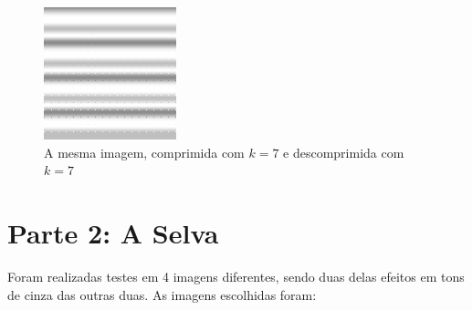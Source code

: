\documentclass{article}
\newcommand\tab[1][1cm]{\hspace*{#1}}
\begin{document}
\begin{figure}[!hbt]
	\centering
	\includegraphics[width=0.2\linewidth]{zoologico/pb2decompressed}
	\caption{A mesma imagem, comprimida com $k=7$ e descomprimida com $k=7$}
\end{figure}

\newpage
\section{\newpage Parte 2: A Selva}
\begin{center}

\end{center}
	\tab Foram realizadas testes em 4 imagens diferentes, sendo duas delas efeitos em tons de cinza das outras duas.
	As imagens escolhidas foram:\\
\end{document}
